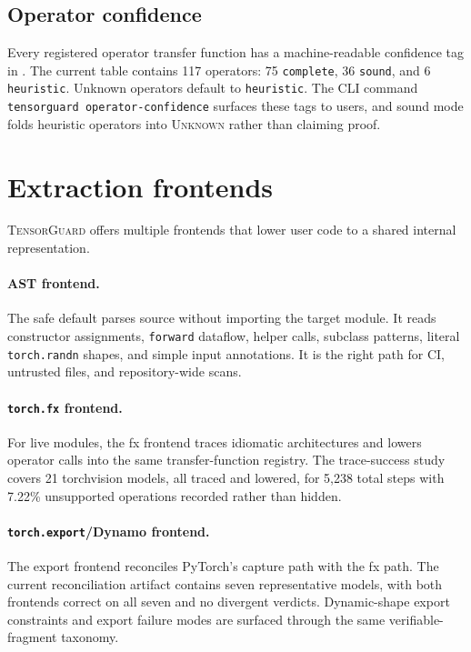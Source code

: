 \documentclass[11pt]{article}
\newcommand{\tg}{\textsc{TensorGuard}}
\newcommand{\unknown}{\textsc{Unknown}}
\begin{document}
\subsection{Operator confidence}

Every registered operator transfer function has a machine-readable confidence
tag in .  The current table contains 117
operators: 75 \texttt{complete}, 36 \texttt{sound}, and 6 \texttt{heuristic}.
Unknown operators default to \texttt{heuristic}.  The CLI command
\texttt{tensorguard operator-confidence} surfaces these tags to users, and
sound mode folds heuristic operators into \unknown{} rather than claiming proof.

\section{Extraction frontends}

\tg{} offers multiple frontends that lower user code to a shared internal
representation.

\paragraph{AST frontend.}
The safe default parses source without importing the target module.  It reads
constructor assignments, \texttt{forward} dataflow, helper calls, subclass
patterns, literal \texttt{torch.randn} shapes, and simple input annotations.  It
is the right path for CI, untrusted files, and repository-wide scans.

\paragraph{\texttt{torch.fx} frontend.}
For live modules, the fx frontend traces idiomatic architectures and lowers
operator calls into the same transfer-function registry.  The trace-success
study covers 21 torchvision models, all traced and lowered, for 5,238 total
steps with 7.22\% unsupported operations recorded rather than hidden.

\paragraph{\texttt{torch.export}/Dynamo frontend.}
The export frontend reconciles PyTorch's capture path with the fx path.  The
current reconciliation artifact contains seven representative models, with both
frontends correct on all seven and no divergent verdicts.  Dynamic-shape export
constraints and export failure modes are surfaced through the same
verifiable-fragment taxonomy.
\end{document}

